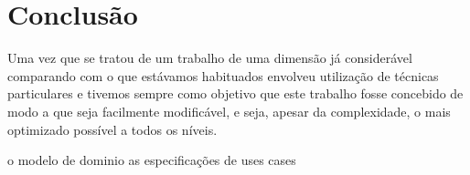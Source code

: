 \chapter{Conclusão}

Uma vez que se tratou de um trabalho de uma dimensão já considerável comparando com o que estávamos habituados envolveu utilização de técnicas particulares e tivemos sempre como objetivo que este trabalho fosse concebido de modo a que seja facilmente modificável, e seja, apesar da complexidade, o mais optimizado possível a todos os níveis.

o modelo de dominio as especificações de uses cases 